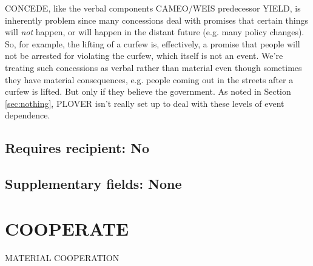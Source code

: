 \documentclass[11pt]{report}
\newcommand{\plcat}[1]{\textsf{#1}}
\newcommand{\ti}[1]{\textit{#1}}
\begin{document}
\plcat{CONCEDE}, like the verbal components CAMEO/WEIS predecessor \plcat{YIELD}, is inherently problem since many concessions deal with promises that certain things will \ti{not} happen, or will happen in the distant future (e.g. many policy changes). So, for example, the lifting of a curfew is, effectively, a promise that people will not be arrested for violating the curfew, which itself is not an event. We're treating such concessions as verbal rather than material even though sometimes they have material consequences, e.g. people coming out in the streets after a curfew is lifted. But only if they believe the government. As noted in Section \ref{sec:nothing}, PLOVER isn't really set up to deal with these levels of event dependence. 

\begin{comment}

pas 2016-10-20

I split CAMEO YIELD but and most of the old categories break out pretty easily but I'm still not quite sure the following belongs here

\item Yield by relinquishing political power, either via voluntary concessions or involuntary surrenders. Use this code when source surrenders power after being challenged through legitimate institutional channels (e.g. elections) or other coercive strategies (e.g. military coups). The target can either be the challenger(s) or the country as a whole.

ptb 2016-12-20
How does this interaction with the hex codings of negative events in PETR 2?

\end{comment}

\subsection{Requires recipient: No}

\subsection{Supplementary fields: None}


\bigskip

\section{COOPERATE}

\textsf{MATERIAL COOPERATION} \vspace{8pt}
\end{document}
